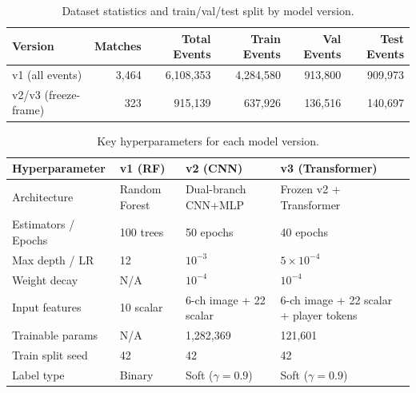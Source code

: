 \documentclass{article}
\begin{document}
\begin{appendices}
\begin{table}[h]
\centering
\caption{Dataset statistics and train/val/test split by model version.}
\begin{tabular}{lrrrrr}
\toprule
\textbf{Version} & \textbf{Matches} & \textbf{Total Events} & \textbf{Train Events} & \textbf{Val Events} & \textbf{Test Events} \\
\midrule
v1 (all events)      & 3,464 & 6,108,353 & 4,284,580 & 913,800 & 909,973 \\
v2/v3 (freeze-frame) & 323   & 915,139   & 637,926   & 136,516 & 140,697 \\
\bottomrule
\end{tabular}
\label{tab:dataset_stats}
\end{table}

\begin{table}[h]
\centering
\caption{Key hyperparameters for each model version.}
\begin{tabular}{llll}
\toprule
\textbf{Hyperparameter} & \textbf{v1 (RF)} & \textbf{v2 (CNN)} & \textbf{v3 (Transformer)} \\
\midrule
Architecture        & Random Forest       & Dual-branch CNN+MLP  & Frozen v2 + Transformer \\
Estimators / Epochs & 100 trees           & 50 epochs            & 40 epochs \\
Max depth / LR      & 12                  & $10^{-3}$            & $5{\times}10^{-4}$ \\
Weight decay        & N/A                 & $10^{-4}$            & $10^{-4}$ \\
Input features      & 10 scalar           & 6-ch image + 22 scalar & 6-ch image + 22 scalar + player tokens \\
Trainable params    & N/A                 & 1,282,369            & 121,601 \\
Train split seed    & 42                  & 42                   & 42 \\
Label type          & Binary              & Soft ($\gamma=0.9$)  & Soft ($\gamma=0.9$) \\
\bottomrule
\end{tabular}
\label{tab:hyperparams}
\end{table}

\end{appendices}
\end{document}
